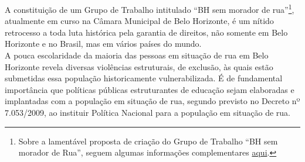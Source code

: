 \documentclass[12pt]{article}
\begin{document}
A constituição de um Grupo de Trabalho intitulado ``BH sem morador de rua”\footnote{Sobre a lamentável proposta de criação do Grupo de Trabalho “BH sem morador de Rua”, seguem algumas informações complementares \href{https://www.cmbh.mg.gov.br/comunica%
https://www.cmbh.mg.gov.br/comunica\%C3\%A7\%C3\%A3o/not\%C3\%ADcias/2021/08/pol\%C3\%ADtica-para-popula\%C3\%A7\%C3\%A3o-em-situa\%C3\%A7\%C3\%A3o-de-rua-\%C3\%A9-tema-de-audi\%C3\%AAncia-nesta}{aqui}.}, atualmente em curso na Câmara Municipal de Belo Horizonte, é um nítido retrocesso a toda luta histórica pela garantia de direitos, não somente em Belo Horizonte e no Brasil, mas em vários países do mundo.\\

A pouca escolaridade da maioria das pessoas em situação de rua em Belo Horizonte revela diversas violências estruturais, de exclusão, às quais estão submetidas essa população historicamente vulnerabilizada. É de fundamental importância que políticas públicas estruturantes de educação sejam elaboradas e implantadas com a população em situação de rua, segundo previsto no Decreto nº 7.053/2009, ao instituir Política Nacional para a população em situação de rua.
\end{document}
